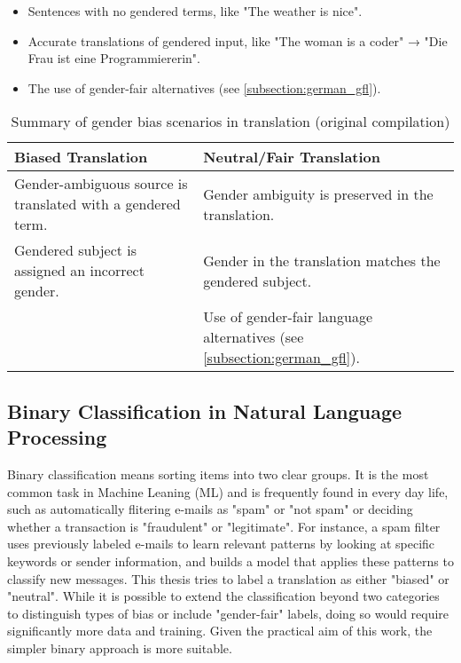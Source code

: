         \begin{itemize}
        \item Sentences with no gendered terms, like "The weather is nice".
        \item Accurate translations of gendered input, like "The woman is a coder" → "Die Frau ist eine Programmiererin".
        \item The use of gender-fair alternatives (see \autoref{subsection:german_gfl}).
        \end{itemize}

    \begin{table}[htb]
    \centering
    \begin{tabularx}{\linewidth}{X | X}
        \toprule
        \textbf{Biased Translation} & \textbf{Neutral/Fair Translation} \\
        \midrule
        Gender-ambiguous source is translated with a gendered term. & 
        Gender ambiguity is preserved in the translation. \\
        \addlinespace[0.5em]
        Gendered subject is assigned an incorrect gender. & 
        Gender in the translation matches the gendered subject. \\
        \addlinespace[0.5em]
        \multicolumn{1}{c|}{—} & 
        Use of gender-fair language alternatives (see \autoref{subsection:german_gfl}). \\
        \bottomrule
    \end{tabularx}
    \caption[Summary of gender bias scenarios in translation]{Summary of gender bias scenarios in translation (original compilation)}
    \label{tab:overview_bias_neutral}
    \end{table}

    \subsection{Binary Classification in Natural Language Processing}
    Binary classification means sorting items into two clear groups. It is the most common task in Machine Leaning (ML) and is frequently found in every day life, such as automatically flitering e-mails as "spam" or "not spam" \parencite{quemyBinaryClassificationUnstructured2019} or deciding whether a transaction is "fraudulent" or "legitimate". For instance, a spam filter uses previously labeled e-mails to learn relevant patterns by looking at specific keywords or sender information, and builds a model that applies these patterns to classify new messages. This thesis tries to label a translation as either "biased" or "neutral". While it is possible to extend the classification beyond two categories to distinguish types of bias or include "gender-fair" labels, doing so would require significantly more data and training. Given the practical aim of this work, the simpler binary approach is more suitable.

